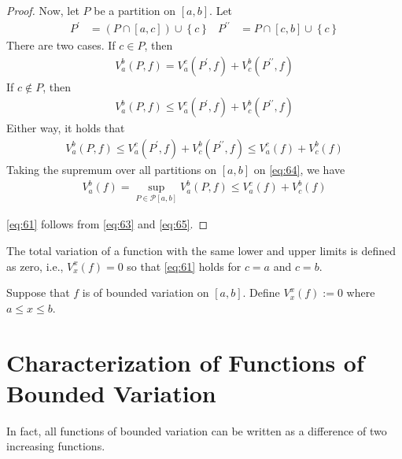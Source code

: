 \documentclass[thmcnt=section, 12pt]{elegantbook}
\begin{document}
\begin{proof}
    \par Now, let $P$ be a partition on $[a, b]$. Let
    \begin{align*}
        P^\prime &= (P \cap [a, c]) \cup \left\{c\right\} & 
        P^{\prime\prime} &= P \cap [c, b] \cup \left\{c\right\}
    \end{align*}
    There are two cases. If $c \in P$, then
    \begin{align*}
        V_a^b(P, f) 
        = V_a^c(P^\prime, f) + V_c^b(P^{\prime\prime}, f)
    \end{align*}
    If $c \notin P$, then 
    \begin{align*}
        V_a^b(P, f) 
        \leq V_a^c(P^\prime, f) + V_c^b(P^{\prime\prime}, f)
    \end{align*}
    Either way, it holds that 
    \begin{align}
        V_a^b(P, f) 
        \leq V_a^c(P^\prime, f) + V_c^b(P^{\prime\prime}, f)
        \leq V_a^c(f) + V_c^b(f)
        \label{eq:64}
    \end{align}
    Taking the supremum over all partitions on $[a, b]$ on \eqref{eq:64}, we have 
    \begin{align}
        V_a^b(f)
        = \sup_{P \in \mathcal{P}[a, b]} V_a^b(P, f) 
        \leq V_a^c(f) + V_c^b(f)
        \label{eq:65}
    \end{align}

    \par \eqref{eq:61} follows from \eqref{eq:63} and \eqref{eq:65}.
\end{proof}

\par The total variation of a function with the same lower and upper limits is defined as zero, i.e.,  $V_x^x(f) = 0$ so that \eqref{eq:61} holds for $c = a$ and $c = b$.

\begin{definition} \label{def:8}
    Suppose that $f$ is of bounded variation on $[a, b]$. Define $V_x^x(f) := 0$ where $a \leq x \leq b$.
\end{definition}


\section{Characterization of Functions of Bounded Variation}


\par In fact, all functions of bounded variation can be written as a difference of two increasing functions.
\end{document}

